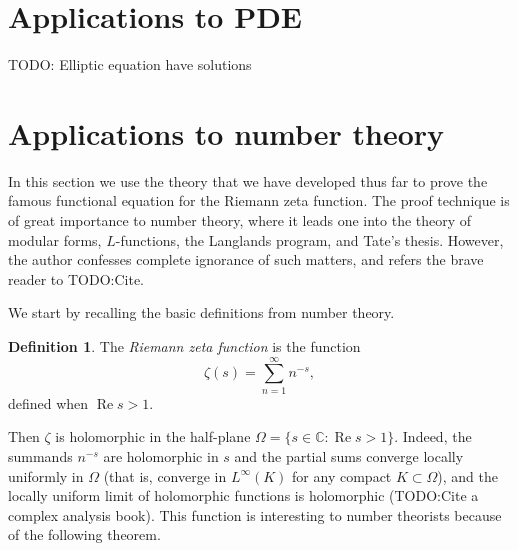 \documentclass[12pt]{book}
\newcommand{\CC}{\mathbb{C}}
\renewcommand{\Re}{\operatorname{Re}}
\newcommand{\dfn}[1]{\emph{#1}\index{#1}}
\theoremstyle{definition}
\newtheorem{definition}[theorem]{Definition}
\begin{document}
\section{Applications to PDE}
TODO: Elliptic equation have solutions

\section{Applications to number theory}
In this section we use the theory that we have developed thus far to prove the famous functional equation for the Riemann zeta function.
The proof technique is of great importance to number theory, where it leads one into the theory of modular forms, $L$-functions, the Langlands program, and Tate's thesis.
However, the author confesses complete ignorance of such matters, and refers the brave reader to TODO:Cite.

We start by recalling the basic definitions from number theory.
\begin{definition}
The \dfn{Riemann zeta function} is the function
$$\zeta(s) = \sum_{n=1}^\infty n^{-s},$$
defined when $\Re s > 1$.
\end{definition}
Then $\zeta$ is holomorphic in the half-plane $\Omega = \{s \in \CC: \Re s > 1\}$.
Indeed, the summands $n^{-s}$ are holomorphic in $s$ and the partial sums converge locally uniformly in $\Omega$ (that is, converge in $L^\infty(K)$ for any compact $K \subset \Omega$), and the locally uniform limit of holomorphic functions is holomorphic (TODO:Cite a complex analysis book).
This function is interesting to number theorists because of the following theorem.
\end{document}
